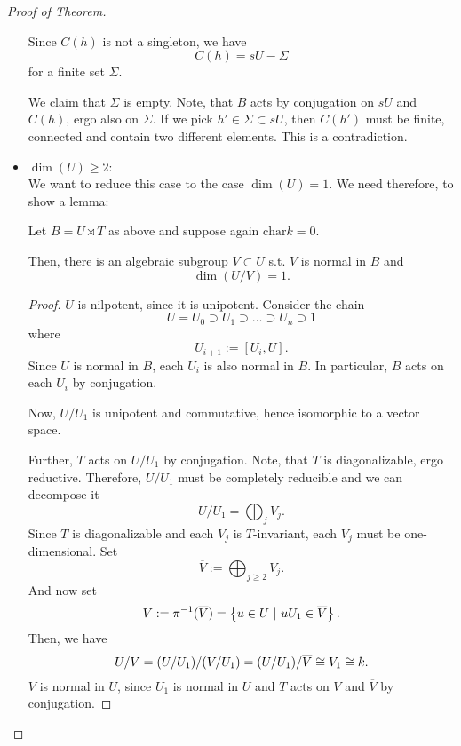 \begin{proof}[Proof of Theorem]
\begin{itemize}
		Since $C(h)$ is not a singleton, we have
		\[ C(h) = sU  - \Sigma \]
		for a finite set $\Sigma$.
		
		We claim that $\Sigma$ is empty. Note, that $B$ acts by conjugation on $sU$ and $C(h)$, ergo also on $\Sigma$. If we pick $h' \in \Sigma \subset sU$, then $C(h')$ must be finite, connected and contain two different elements. This is a contradiction.
		\item $\dim(U) \geq 2$:\\
		We want to reduce this case to the case $\dim (U) = 1$. We need therefore, to show a lemma:
		\begin{lemma}
			Let $B = U \rtimes T$ as above and suppose again $\mathrm{char} k = 0$.
			
			Then, there is an algebraic subgroup $V \subset U$ s.t. $V$ is normal in $B$ and
			\[ \dim(U/V) = 1. \]
		\end{lemma}
	\begin{proof}
		$U$ is nilpotent, since it is unipotent.
		Consider the chain
		\[ U = U_0 \supset U_1 \supset \ldots \supset U_n \supset 1 \]
		where
		\[ U_{i+1} := [U_i, U]. \]
		Since $U$ is normal in $B$, each $U_i$ is also normal in $B$. In particular, $B$ acts on each $U_i$ by conjugation.
		
		Now, $U/U_1$ is unipotent and commutative, hence isomorphic to a vector space.
		
		Further, $T$ acts on $U/U_1$ by conjugation. Note, that $T$ is diagonalizable, ergo reductive. Therefore, $U/U_1$ must be completely reducible and we can decompose it
		\[ U/U_1 = \bigoplus_j V_j. \]
		Since $T$ is diagonalizable and each $V_j$ is $T$-invariant, each $V_j$ must be one-dimensional. Set
		\[ \overline{V} := \bigoplus_{j \geq 2} V_j. \]
		And now set
		\[ V := \pi^{-1}(\overline{V}) = \left\lbrace u \in U ~ | ~ uU_1 \in \overline{V}\right\rbrace. \]
		Then, we have
		\[ U/V = (U/U_1) / (V / U_1) = ( U / U_1) / \overline{V} \overset{}{\cong} V_1 \overset{}{\cong} k. \]
		$V$ is normal in $U$, since $U_1$ is normal in $U$ and $T$ acts on $V$ and $\overline{V}$ by conjugation.
	\end{proof}


\end{itemize}
\end{proof}
